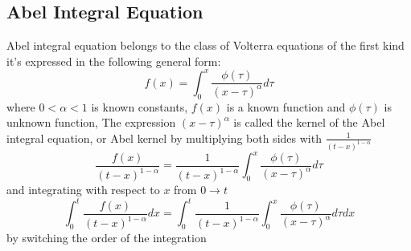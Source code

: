 \documentclass[]{article}
\begin{document}
\subsection{Abel Integral Equation}
Abel integral equation belongs to the class of Volterra equations of the first kind
it's expressed in the following general form:
\[
f(x) = \int_{0}^{x} \frac{\phi(\tau)}{{(x-\tau )}^\alpha} d\tau
\]
where $0<\alpha<1$ is known constants, $f(x)$ is a known function and $\phi(\tau)$ is unknown function,
The expression ${(x-\tau )}^\alpha$  is called the kernel of the Abel integral equation, or Abel kernel
by multiplying both sides with $\displaystyle \frac{1}{{(t-x)}^{1-\alpha}}$
\[
\frac{f(x)}{{(t-x)}^{1-\alpha}} = \frac{1}{{(t-x)}^{1-\alpha}} \int_{0}^{x} \frac{\phi(\tau)}{{(x-\tau)}^\alpha} d\tau
\]
and integrating with respect to $x$ from $0 \to t$
\[
\int_{0}^{t} \frac{f(x)}{{(t-x)}^{1-\alpha}} dx=  \int_{0}^{t} \frac{1}{{(t-x)}^{1-\alpha}} \int_{0}^{x} \frac{\phi(\tau)}{{(x-\tau)}^\alpha} d\tau dx
\]
by switching the order of the integration 

\begin{center}
\end{center}
\end{document}
